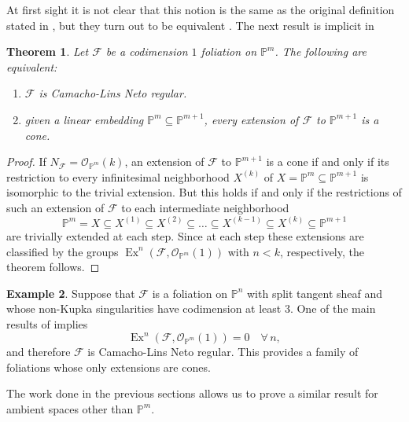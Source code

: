 \documentclass[reqno]{amsart}
\theoremstyle{plain}
\renewcommand\P{\mathbb{P}}
\newcommand{\OO}{\mathcal{O}}
\newcommand{\F}{\mathscr{F}}
\DeclareMathOperator{\Ex}{Ex}
\newcounter{Theorem}
\newtheorem{theorem}{Theorem}[section]
\theoremstyle{definition}
\newtheorem{example}[theorem]{Example}
\theoremstyle{named}
\begin{document}
At first sight it is not clear that this notion is the same as the original definition stated in \cite{camacho1982topology}, but they turn out to be equivalent \cite[pag. 1600/08]{molinuevo2016unfoldings}. The next result is implicit in \cite[Prop. 3]{camacho1982topology}

\begin{theorem} \label{teo:CLN regularity}
    Let $\F$ be a codimension $1$ foliation on $\P^m$. The following are equivalent:
\begin{enumerate}
    \item $\F$ is Camacho-Lins Neto regular.
    \item given a linear embedding $\P^m\subseteq \P^{m+1}$, every extension of $\F$ to $\P^{m+1}$ is a cone.
\end{enumerate}
\end{theorem}

\begin{proof}
If $N_\F=\OO_{\P^m}(k)$, an extension of $\F$ to $\P^{m+1}$ is a cone if and only if its restriction to every infinitesimal neighborhood $X^{(k)}$ of $X=\P^m\subseteq \P^{m+1}$ is isomorphic to the trivial extension. But this holds if and only if the restrictions of such an extension of $\F$ to each intermediate neighborhood $$\P^m = X \subseteq X^{(1)}\subseteq X^{(2)}\subseteq \dots \subseteq X^{(k-1)}\subseteq X^{(k)}\subseteq \P^{m+1}$$ are trivially extended at each step. Since at each step these extensions are classified by the groups $\Ex^n(\F,\OO_{\P^m}(1))$ with $n< k$, respectively, the theorem follows.
\end{proof}

\begin{example}
Suppose that $\F$ is a foliation on $\P^n$ with split tangent sheaf and whose non-Kupka singularities have codimension at least 3. One of the main results of \cite{massri2018kupka} implies
\[
\Ex^n(\F,\OO_{\P^m}(1))=0 \quad\forall\, n,
\]
and therefore $\F$ is Camacho-Lins Neto regular. This provides a family of foliations whose only extensions are cones.
\end{example}




The work done in the previous sections allows us to prove a similar result for ambient spaces other than $\P^m$.
\end{document}
